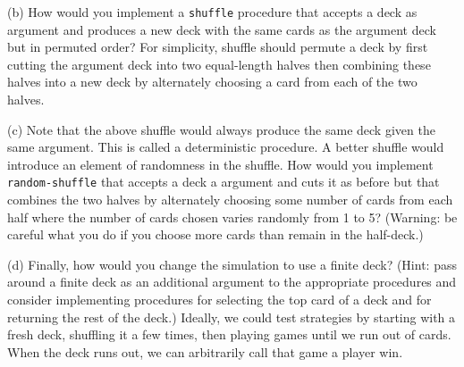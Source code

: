 (b) How would you implement a {\tt shuffle} procedure that accepts a
deck as argument and produces a new deck with the same cards as the
argument deck but in permuted order?  For simplicity, shuffle should
permute a deck by first cutting the argument deck into two
equal-length halves then combining these halves into a new deck by
alternately choosing a card from each of the two halves.

(c) Note that the above shuffle would always produce the same deck
given the same argument.  This is called a deterministic procedure.  A
better shuffle would introduce an element of randomness in the
shuffle.  How would you implement {\tt random-shuffle} that accepts a
deck a argument and cuts it as before but that combines the two halves
by alternately choosing some number of cards from each half where the
number of cards chosen varies randomly from 1 to 5?  (Warning: be
careful what you do if you choose more cards than remain in the
half-deck.)

(d)  Finally, how would you change the simulation to use a finite deck?
(Hint: pass around a finite deck as an additional argument to the
appropriate procedures and consider implementing procedures for
selecting the top card of a deck and for returning the rest of the
deck.) Ideally, we could test strategies by starting with a fresh
deck, shuffling it a few times, then playing games until we run out of
cards. When the deck runs out, we can arbitrarily call that game a
player win.




